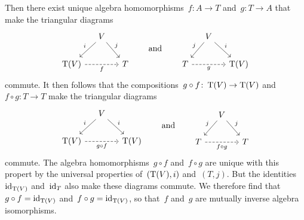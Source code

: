 \begin{recall}
\begin{description}
      Then there exist unique algebra homomorphisms~$f \colon A \to T$ and~$g \colon T \to A$ that make the triangular diagrams
      \[
        \begin{tikzcd}[column sep = small]
          {}
          &
          V
          \arrow{dl}[above left]{i}
          \arrow{dr}[above right]{j}
          &
          {}
          \\
          \Tensor(V)
          \arrow[dashed]{rr}[below]{f}
          &
          {}
          &
          T
        \end{tikzcd}
        \qquad\text{and}\qquad
        \begin{tikzcd}[column sep = small]
          {}
          &
          V
          \arrow{dl}[above left]{j}
          \arrow{dr}[above right]{i}
          &
          {}
          \\
          T
          \arrow[dashed]{rr}[below]{g}
          &
          {}
          &
          \Tensor(V)
        \end{tikzcd}
      \]
      commute.
      It then follows that the compositions~$g \circ f \colon \operatorname{T}(V) \to \operatorname{T}(V)$ and~$f \circ g \colon T \to T$ make the triangular diagrams
      \[
        \begin{tikzcd}[column sep = small]
          {}
          &
          V
          \arrow{dl}[above left]{i}
          \arrow{dr}[above right]{i}
          &
          {}
          \\
          \Tensor(V)
          \arrow[dashed]{rr}[below]{g \circ f}
          &
          {}
          &
          \Tensor(V)
        \end{tikzcd}
        \qquad\text{and}\qquad
        \begin{tikzcd}[column sep = small]
          {}
          &
          V
          \arrow{dl}[above left]{j}
          \arrow{dr}[above right]{j}
          &
          {}
          \\
          T
          \arrow[dashed]{rr}[below]{f \circ g}
          &
          {}
          &
          T
        \end{tikzcd}
      \]
      commute.
      The algebra homomorphisms~$g \circ f$ and~$f \circ g$ are unique with this propert by the universal properties of~$(\operatorname{T}(V), i)$ and~$(T, j)$.
      But the identities~$\operatorname{id}_{\operatorname{T}(V)}$ and~$\operatorname{id}_T$ also make these diagrams commute.
      We therefore find that~$g \circ f = \operatorname{id}_{\operatorname{T}(V)}$ and~$f \circ g = \operatorname{id}_{\operatorname{T}(V)}$, so that~$f$ and~$g$ are mutually inverse algebra isomorphisms.
    

\end{description}
\end{recall}
